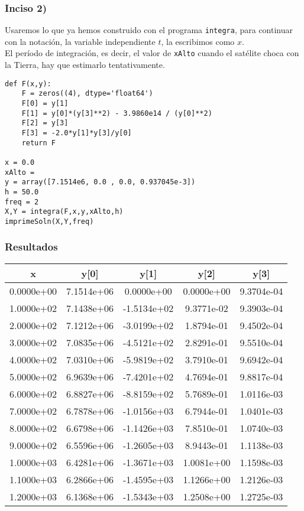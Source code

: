 \begin{frame}
\frametitle{Inciso 2)}
Usaremos lo que ya hemos construido con el programa \texttt{integra}, para continuar con la notación, la variable independiente $t$, la escribimos como $x$.
\\
\medskip
El período de integración, es decir, el valor de \texttt{xAlto} cuando el satélite choca con la Tierra, hay que estimarlo tentativamente.
\end{frame}
\begin{frame}[fragile]
\begin{lstlisting}
def F(x,y):
    F = zeros((4), dtype='float64')
    F[0] = y[1]
    F[1] = y[0]*(y[3]**2) - 3.9860e14 / (y[0]**2)
    F[2] = y[3]
    F[3] = -2.0*y[1]*y[3]/y[0]
    return F

x = 0.0
xAlto =
y = array([7.1514e6, 0.0 , 0.0, 0.937045e-3])
h = 50.0
freq = 2
X,Y = integra(F,x,y,xAlto,h)
imprimeSoln(X,Y,freq)
\end{lstlisting}
\end{frame}
\begin{frame}
\frametitle{Resultados}
\fontsize{10}{10}\selectfont
\begin{tabular}{c | c | c | c | c}
 x   & y[0] & y[1] & y[2] & y[3] \\ \hline 
   0.0000e+00 & 7.1514e+06 & 0.0000e+00 & 0.0000e+00 & 9.3704e-04 \\ \hline
   1.0000e+02 & 7.1438e+06 & -1.5134e+02 & 9.3771e-02 & 9.3903e-04 \\ \hline
   2.0000e+02 & 7.1212e+06 & -3.0199e+02 & 1.8794e-01 & 9.4502e-04 \\ \hline
   3.0000e+02 & 7.0835e+06 & -4.5121e+02 & 2.8291e-01 & 9.5510e-04 \\ \hline
   4.0000e+02 & 7.0310e+06 & -5.9819e+02 & 3.7910e-01 & 9.6942e-04 \\ \hline
   5.0000e+02 & 6.9639e+06 & -7.4201e+02 & 4.7694e-01 & 9.8817e-04 \\ \hline
   6.0000e+02 & 6.8827e+06 & -8.8159e+02 & 5.7689e-01 & 1.0116e-03 \\ \hline
   7.0000e+02 & 6.7878e+06 & -1.0156e+03 & 6.7944e-01 & 1.0401e-03 \\ \hline
   8.0000e+02 & 6.6798e+06 & -1.1426e+03 & 7.8510e-01 & 1.0740e-03 \\ \hline
   9.0000e+02 & 6.5596e+06 & -1.2605e+03 & 8.9443e-01 & 1.1138e-03 \\ \hline
   1.0000e+03 & 6.4281e+06 & -1.3671e+03 & 1.0081e+00 & 1.1598e-03 \\ \hline
   1.1000e+03 & 6.2866e+06 & -1.4595e+03 & 1.1266e+00 & 1.2126e-03 \\ \hline
   1.2000e+03 & 6.1368e+06 & -1.5343e+03 & 1.2508e+00 & 1.2725e-03
\end{tabular}
\end{frame}

